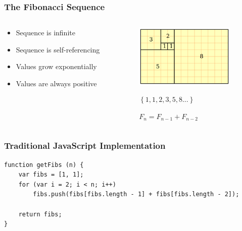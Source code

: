 \documentclass{beamer}
\begin{document}
    \begin{frame}
        \frametitle{The Fibonacci Sequence}

        \begin{columns}[c]
            \begin{column}[T]{5cm}
                \begin{itemize}
                    \item Sequence is infinite
                    \item Sequence is self-referencing
                    \item Values grow exponentially
                    \item Values are always positive
                \end{itemize}
            \end{column}
            \begin{column}[T]{5cm}
                \begin{figure}
                    \centering
                    \includegraphics[height=3cm]{./fibs/images/FibonacciBlocks.png}
                \end{figure}

                \begin{figure}
                    \centering
                    \begin{math}
                        \left\{1,1,2,3,5,8...\right\}
                    \end{math}
                \end{figure}
               
                \begin{figure}
                    \centering
                    \begin{math}
                        F_{n} = F_{n-1} + F_{n-2}
                    \end{math}
                \end{figure}
            \end{column}
        \end{columns}
    \end{frame}

    \lstset{language=JavaScript}
    \begin{frame}[fragile=singleslide]
        \frametitle{Traditional JavaScript Implementation}

        \begin{lstlisting}
function getFibs (n) {
    var fibs = [1, 1];
    for (var i = 2; i < n; i++) 
        fibs.push(fibs[fibs.length - 1] + fibs[fibs.length - 2]);

    return fibs;
}
        \end{lstlisting}
    \end{frame}
\end{document}

